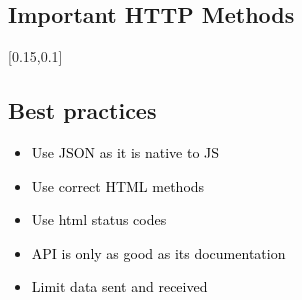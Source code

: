 \documentclass[main.tex,fontsize=6pt,paper=a4,paper=landscape,DIV=calc,]{scrartcl}
\begin{document}
\begin{multicols*}{4}
\subsection{Important HTTP Methods}  
[0.15,0.1]

\subsection{Best practices}  
\begin{itemize}
\item \textcolor{black}{Use JSON as it is native to JS}
\item \textcolor{black}{Use correct HTML methods}
\item \textcolor{black}{Use html status codes}
\item \textcolor{black}{API is only as good as its documentation}
\item \textcolor{black}{Limit data sent and received}
\end{itemize} 


\end{multicols*}
\end{document}
